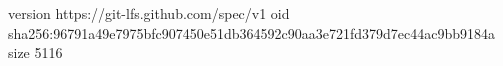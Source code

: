 version https://git-lfs.github.com/spec/v1
oid sha256:96791a49e7975bfc907450e51db364592c90aa3e721fd379d7ec44ac9bb9184a
size 5116
